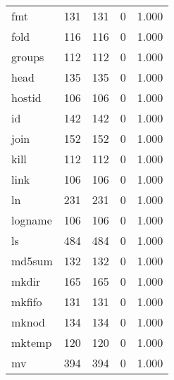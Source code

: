 \begin{longtable}{lp{4.5cm}p{4.5cm}p{4.5cm}p{4.5cm}}
fmt       &                     131 &              131 &                 0 &                        1.000 \\
fold      &                     116 &              116 &                 0 &                        1.000 \\
groups    &                     112 &              112 &                 0 &                        1.000 \\
head      &                     135 &              135 &                 0 &                        1.000 \\
hostid    &                     106 &              106 &                 0 &                        1.000 \\
id        &                     142 &              142 &                 0 &                        1.000 \\
join      &                     152 &              152 &                 0 &                        1.000 \\
kill      &                     112 &              112 &                 0 &                        1.000 \\
link      &                     106 &              106 &                 0 &                        1.000 \\
ln        &                     231 &              231 &                 0 &                        1.000 \\
logname   &                     106 &              106 &                 0 &                        1.000 \\
ls        &                     484 &              484 &                 0 &                        1.000 \\
md5sum    &                     132 &              132 &                 0 &                        1.000 \\
mkdir     &                     165 &              165 &                 0 &                        1.000 \\
mkfifo    &                     131 &              131 &                 0 &                        1.000 \\
mknod     &                     134 &              134 &                 0 &                        1.000 \\
mktemp    &                     120 &              120 &                 0 &                        1.000 \\
mv        &                     394 &              394 &                 0 &                        1.000 \\

\end{longtable}
